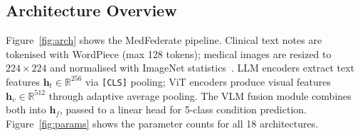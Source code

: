 \documentclass[conference]{IEEEtran}
\begin{document}
\subsection{Architecture Overview}

Figure~\ref{fig:arch} shows the MedFederate pipeline. Clinical text notes
are tokenised with WordPiece (max 128 tokens); medical images
are resized to $224{\times}224$ and normalised with ImageNet
statistics~\cite{Deng2009}. LLM encoders extract text features
$\mathbf{h}_t\!\in\!\mathbb{R}^{256}$ via \texttt{[CLS]} pooling; ViT
encoders produce visual features $\mathbf{h}_v\!\in\!\mathbb{R}^{512}$
through adaptive average pooling. The VLM fusion module combines both into
$\mathbf{h}_f$, passed to a linear head for 5-class condition prediction.
Figure~\ref{fig:params} shows the parameter counts for all 18 architectures.
\end{document}
